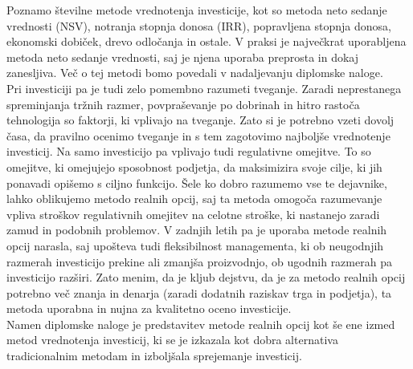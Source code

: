 Poznamo številne metode vrednotenja investicije, kot so metoda neto sedanje vrednosti (NSV), notranja stopnja donosa (IRR), popravljena stopnja donosa, ekonomski dobiček, drevo odločanja in ostale. V praksi je največkrat uporabljena metoda neto sedanje vrednosti, saj je njena uporaba preprosta in dokaj zanesljiva. Več o tej metodi bomo povedali v nadaljevanju diplomske naloge. \\

Pri investiciji pa je tudi zelo pomembno razumeti tveganje. Zaradi neprestanega spreminjanja tržnih razmer, povpraševanje po dobrinah in hitro rastoča tehnologija so faktorji, ki vplivajo na tveganje. Zato si je potrebno vzeti dovolj časa, da pravilno ocenimo tveganje in s tem zagotovimo najboljše vrednotenje investicij. Na samo investicijo pa vplivajo tudi regulativne omejitve. To so omejitve, ki omejujejo sposobnost podjetja, da maksimizira svoje cilje, ki jih ponavadi opišemo s ciljno funkcijo. Šele ko dobro razumemo vse te dejavnike, lahko oblikujemo metodo realnih opcij, saj ta metoda omogoča razumevanje vpliva stroškov regulativnih omejitev na celotne stroške, ki nastanejo zaradi zamud in podobnih problemov. V zadnjih letih pa je uporaba metode realnih opcij narasla, saj upošteva tudi fleksibilnost managementa, ki ob neugodnjih razmerah investicijo prekine ali zmanjša proizvodnjo, ob ugodnih razmerah pa investicijo razširi. Zato menim, da je kljub dejstvu, da je za metodo realnih opcij potrebno več znanja in denarja (zaradi dodatnih raziskav trga in podjetja), ta metoda uporabna in nujna za kvalitetno oceno investicije.   \\   

Namen diplomske naloge je predstavitev metode realnih opcij kot še ene izmed metod vrednotenja investicij, ki se je izkazala kot dobra alternativa tradicionalnim metodam in izboljšala sprejemanje investicij. \\

\pagebreak

